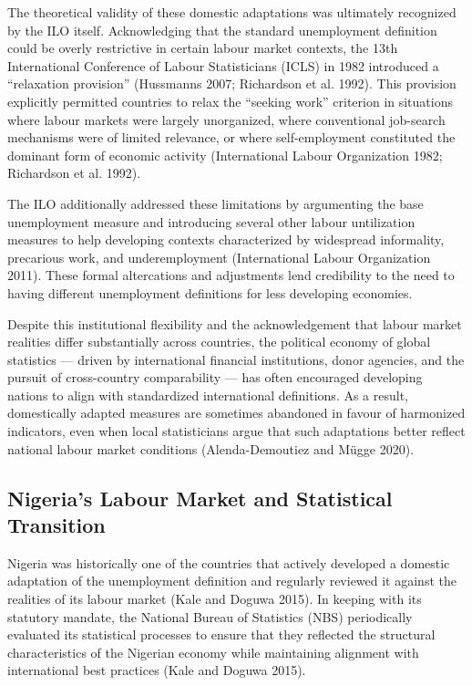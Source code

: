 \documentclass[
  letterpaper,
  DIV=11,
  numbers=noendperiod]{scrartcl}
\begin{document}
The theoretical validity of these domestic adaptations was ultimately
recognized by the ILO itself. Acknowledging that the standard
unemployment definition could be overly restrictive in certain labour
market contexts, the 13th International Conference of Labour
Statisticians (ICLS) in 1982 introduced a ``relaxation provision''
(Hussmanns 2007; Richardson et al. 1992). This provision explicitly
permitted countries to relax the ``seeking work'' criterion in
situations where labour markets were largely unorganized, where
conventional job-search mechanisms were of limited relevance, or where
self-employment constituted the dominant form of economic activity
(International Labour Organization 1982; Richardson et al. 1992).

The ILO additionally addressed these limitations by argumenting the base
unemployment measure and introducing several other labour untilization
measures to help developing contexts characterized by widespread
informality, precarious work, and underemployment (International Labour
Organization 2011). These formal altercations and adjustments lend
credibility to the need to having different unemployment definitions for
less developing economies.

Despite this institutional flexibility and the acknowledgement that
labour market realities differ substantially across countries, the
political economy of global statistics --- driven by international
financial institutions, donor agencies, and the pursuit of cross-country
comparability --- has often encouraged developing nations to align with
standardized international definitions. As a result, domestically
adapted measures are sometimes abandoned in favour of harmonized
indicators, even when local statisticians argue that such adaptations
better reflect national labour market conditions (Alenda-Demoutiez and
Mügge 2020).

\subsection{Nigeria's Labour Market and Statistical
Transition}\label{nigerias-labour-market-and-statistical-transition}

Nigeria was historically one of the countries that actively developed a
domestic adaptation of the unemployment definition and regularly
reviewed it against the realities of its labour market (Kale and Doguwa
2015). In keeping with its statutory mandate, the National Bureau of
Statistics (NBS) periodically evaluated its statistical processes to
ensure that they reflected the structural characteristics of the
Nigerian economy while maintaining alignment with international best
practices (Kale and Doguwa 2015).
\end{document}
